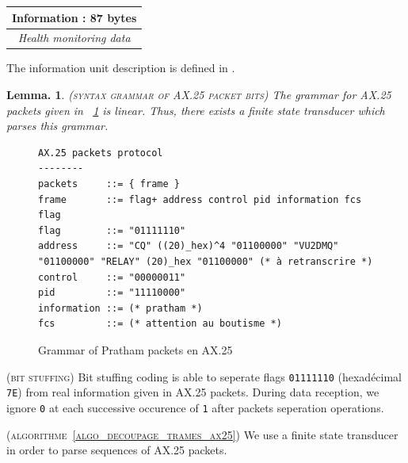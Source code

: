 \documentclass[a4paper]{report}
\newtheorem{lemma}[theorem]{Lemma.}
\newenvironment{implementation}[1][Impl\'ementation.]{\begin{trivlist}
\item[\hskip \labelsep {\bfseries #1}]}{\end{trivlist}}
\newenvironment{definition}[1][Definition.]{\begin{trivlist}
\item[\hskip \labelsep {\bfseries #1}]}{\end{trivlist}}
\newenvironment{remark}[1][Remark.]{\begin{trivlist}
\item[\hskip \labelsep {\bfseries #1}]}{\end{trivlist}}
\begin{document}
\begin{definition}
\begin{center}
  \begin{footnotesize}
    \begin{tabular}{|c|}
      \hline
      Information : 87 bytes\\
      \hline
      \textit{Health monitoring data}\cite{IITB}\\
      \hline
    \end{tabular}
  \end{footnotesize}
\end{center}

\end{definition}

The information unit description is defined in \cite{IITB}.


\begin{lemma}
  (\textsc{syntax grammar of AX.25 packet bits})
  The grammar for AX.25 packets given in ~\ref{fig:EBNF_ax25} is linear. Thus, there exists a finite state transducer which parses this grammar.
\end{lemma}

\begin{figure}
{\scriptsize
\begin{verbatim}
AX.25 packets protocol
--------
packets     ::= { frame }
frame       ::= flag+ address control pid information fcs flag
flag        ::= "01111110"
address     ::= "CQ" ((20)_hex)^4 "01100000" "VU2DMQ" "01100000" "RELAY" (20)_hex "01100000" (* à retranscrire *)
control     ::= "00000011"
pid         ::= "11110000"
information ::= (* pratham *)
fcs         ::= (* attention au boutisme *)
\end{verbatim}
}
\caption{Grammar of Pratham packets en AX.25}
\label{fig:EBNF_ax25}
\end{figure}

\begin{remark}
  \textsc{(bit stuffing)}
  Bit stuffing coding is able to seperate flags \texttt{01111110} (hexad\'ecimal \texttt{7E}) from real information given in AX.25 packets\cite{IITB}. During data reception, we ignore \texttt{0} at each successive occurence of \texttt{1} after packets seperation operations.
\end{remark}


\begin{implementation}
  (\textsc{algorithme~\ref{algo_decoupage_trames_ax25}})
  { \color{rltred}{\Radioactivity} }
  We use a finite state transducer in order to parse sequences of AX.25 packets.
\end{implementation}
\end{document}
